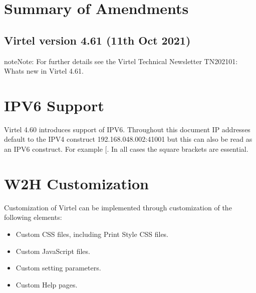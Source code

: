 \documentclass[letterpaper,10pt,english]{sphinxmanual}
\begin{document}
\newpage


\chapter{Summary of Amendments}
\label{\detokenize{Customization:summary-of-amendments}}\label{\detokenize{Customization:virtel461cs-summary-of-amendments}}

\section{Virtel version 4.61 (11th Oct 2021)}
\label{\detokenize{Customization:virtel-version-4-61-11th-oct-2021}}
\begin{sphinxadmonition}{note}{Note:}
\sphinxAtStartPar
For further details see the Virtel Technical Newsletter TN202101: Whats new in Virtel 4.61.
\end{sphinxadmonition}


\chapter{IPV6 Support}
\label{\detokenize{Customization:ipv6-support}}
\sphinxAtStartPar
Virtel 4.60 introduces support of IPV6. Throughout this document IP addresses default to the IPV4 construct \sphinxhyphen{} 192.168.048.002:41001 but this can also be read as an IPV6 construct. For example {[}. In all cases the square brackets are essential.


\chapter{W2H Customization}
\label{\detokenize{Customization:w2h-customization}}
\sphinxAtStartPar
Customization of Virtel can be implemented through customization of the following elements:
\begin{itemize}
\item {} 
\sphinxAtStartPar
Custom CSS files, including Print Style CSS files.

\item {} 
\sphinxAtStartPar
Custom JavaScript files.

\item {} 
\sphinxAtStartPar
Custom setting parameters.

\item {} 
\sphinxAtStartPar
Custom Help pages.

\end{itemize}
\end{document}
